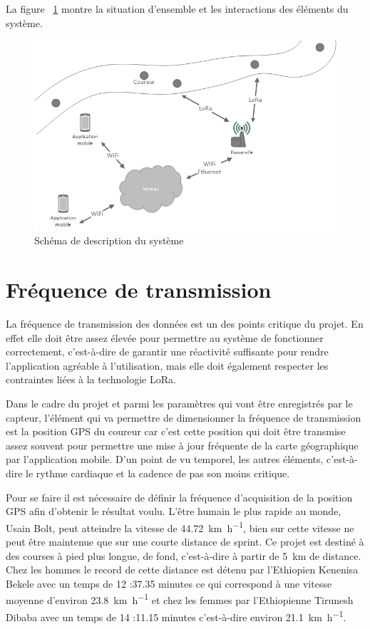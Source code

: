La figure ~\ref{fig:elem_system} montre la situation d’ensemble et les interactions des éléments du système.

\begin{figure}[htb]
\centering 
\includegraphics[width=1\columnwidth]{../images/schema_systeme_projet.png} 
\caption[ElemSystem]{Schéma de description du système}
\label{fig:elem_system}
\end{figure}

\section{Fréquence de transmission}

La fréquence de transmission des données est un des points critique du projet. En effet elle doit être assez élevée pour permettre au système de fonctionner correctement, c’est-à-dire de garantir une réactivité suffisante pour rendre l’application agréable à l’utilisation, mais elle doit également respecter les contraintes liées à la technologie LoRa.

Dans le cadre du projet et parmi les paramètres qui vont être enregistrés par le capteur, l’élément qui va permettre de dimensionner la fréquence de transmission est la position GPS du coureur car c’est cette position qui doit être transmise assez souvent pour permettre une mise à jour fréquente de la carte géographique par l’application mobile. D’un point de vu temporel, les autres éléments, c’est-à-dire le rythme cardiaque et la cadence de pas son moins critique.

Pour se faire il est nécessaire de définir la fréquence d’acquisition de la position GPS afin d’obtenir le résultat voulu. L’être humain le plus rapide au monde, Usain Bolt, peut atteindre la vitesse de \SI{44.72}{\km\per\hour}, bien sur cette vitesse ne peut être maintenue que sur une courte distance de sprint. Ce projet est destiné à des courses à pied plus longue, de fond, c’est-à-dire à partir de \SI{5}{\km} de distance. Chez les hommes le record de cette distance est détenu par l’Ethiopien Kenenisa Bekele avec un temps de 12 :37.35 minutes ce qui correspond à une vitesse moyenne d’environ \SI{23.8}{\km\per\hour} et chez les femmes par l’Ethiopienne Tirunesh Dibaba avec un temps de 14 :11.15 minutes c’est-à-dire environ \SI{21.1}{\km\per\hour}. \cite{iaff_all_time_top_list}

